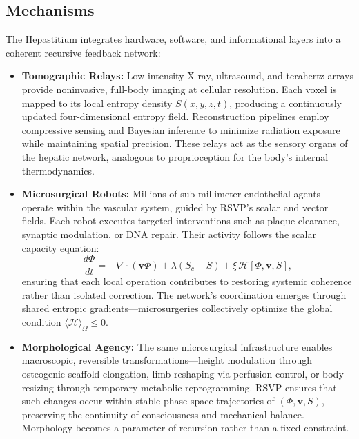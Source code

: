 \documentclass[12pt]{article}
\begin{document}
\subsection{Mechanisms}
\label{subsec:hepastitium_mechanisms}

The Hepastitium integrates hardware, software, and informational layers into a coherent recursive feedback network:

\begin{itemize}
  \item \textbf{Tomographic Relays:} Low-intensity X-ray, ultrasound, and terahertz arrays provide noninvasive, full-body imaging at cellular resolution.  
  Each voxel is mapped to its local entropy density \(S(x,y,z,t)\), producing a continuously updated four-dimensional entropy field.  
  Reconstruction pipelines employ compressive sensing and Bayesian inference to minimize radiation exposure while maintaining spatial precision.  
  These relays act as the sensory organs of the hepatic network, analogous to proprioception for the body’s internal thermodynamics.

  \item \textbf{Microsurgical Robots:} Millions of sub-millimeter endothelial agents operate within the vascular system, guided by RSVP’s scalar and vector fields.  
  Each robot executes targeted interventions such as plaque clearance, synaptic modulation, or DNA repair.  
  Their activity follows the scalar capacity equation:
  \begin{equation}
  \frac{d\Phi}{dt} = -\nabla\!\cdot(\mathbf{v}\Phi) + \lambda(S_c - S) + \xi\,\mathcal{H}[\Phi,\mathbf{v},S],
  \label{eq:phi_dynamics}
  \end{equation}
  ensuring that each local operation contributes to restoring systemic coherence rather than isolated correction.  
  The network’s coordination emerges through shared entropic gradients—microsurgeries collectively optimize the global condition \(\langle \mathcal{H} \rangle_\Omega \le 0\).

  \item \textbf{Morphological Agency:}  
  The same microsurgical infrastructure enables macroscopic, reversible transformations—height modulation through osteogenic scaffold elongation, limb reshaping via perfusion control, or body resizing through temporary metabolic reprogramming.  
  RSVP ensures that such changes occur within stable phase-space trajectories of \((\Phi, \mathbf{v}, S)\), preserving the continuity of consciousness and mechanical balance.  
  Morphology becomes a parameter of recursion rather than a fixed constraint.
\end{itemize}
\end{document}
